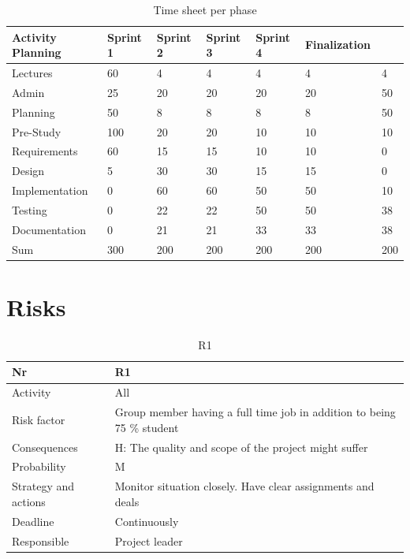 \documentclass[11pt]{book}
\begin{document}
\begin{table}[H]
\centering
\begin{tabular}{ l | l l l l l l }
	Activity		Planning 	& Sprint 1 	& Sprint 2 	& Sprint 3 	& Sprint 4 	& Finalization	\\ \hline		
	Lectures		& 60 		& 4 		& 4 		& 4 		& 4 		& 4				\\ \hline
	Admin			& 25 		& 20 		& 20 		& 20 		& 20 		& 50			\\ \hline
	Planning		& 50 		& 8 		& 8 		& 8 		& 8 		& 50			\\ \hline
	Pre-Study		& 100 		& 20 		& 20 		& 10 		& 10 		& 10			\\ \hline
	Requirements	& 60 		& 15 		& 15 		& 10 		& 10 		& 0				\\ \hline
	Design			& 5 		& 30 		& 30 		& 15 		& 15 		& 0				\\ \hline
	Implementation	& 0 		& 60 		& 60 		& 50 		& 50 		& 10			\\ \hline
	Testing			& 0 		& 22 		& 22 		& 50 		& 50 		& 38			\\ \hline
	Documentation	& 0 		& 21 		& 21 		& 33 		& 33 		& 38			\\ \hline
	Sum				& 300 		& 200 		& 200 		& 200 		& 200 		& 200
\end{tabular}
\label{tab:plan_time_per_phase}
\caption{Time sheet per phase}
\end{table}

\section{Risks}\label{sec:project_risk_assessment}

\begin{table}[H]
\centering
\begin{tabular}{ l  p{11cm} }
	Nr						& R1 																		\\ \hline
	Activity				& All 																		\\ \hline
	Risk factor				& Group member having a full time job in addition to being 75 \% student 	\\ \hline
	Consequences			& H: The quality and scope of the project might suffer 						\\ \hline
	Probability				& M 																		\\ \hline
	Strategy and actions	& Monitor situation closely. Have clear assignments and deals 				\\ \hline
	Deadline				& Continuously 																\\ \hline
	Responsible				& Project leader 															\\ 
\end{tabular}
\label{tab:risk_1}
\caption{R1}
\end{table}
\end{document}
